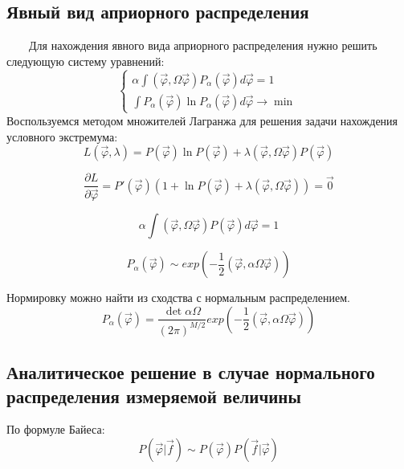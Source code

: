\documentclass{config}
\begin{document}
\subsection{Явный вид априорного распределения}
~~~~Для нахождения явного вида априорного распределения нужно решить следующую систему уравнений:
\begin{equation*}
 \begin{cases}
   \alpha \int (\vec{\varphi}, \Omega \vec{\varphi}) P_{\alpha}(\vec{\varphi}) d\vec{\varphi} = 1\\
   \int P_{\alpha}(\vec{\varphi}) \ln{P_{\alpha}(\vec{\varphi})}d \vec{\varphi} \rightarrow \min{}
 \end{cases}
\end{equation*}
Воспользуемся методом множителей Лагранжа для решения задачи нахождения условного экстремума:
\begin{equation}
    L(\vec{\varphi}, \lambda) = P(\vec{\varphi}) \ln{P(\vec{\varphi})} + \lambda (\vec{\varphi}, \Omega \vec{\varphi}) P(\vec{\varphi})
\end{equation}

\begin{equation}
    \frac{\partial L}{\partial \vec{\varphi}} = P'(\vec{\varphi}) (1 + \ln{P(\vec{\varphi})} + \lambda (\vec{\varphi}, \Omega \vec{\varphi})) = \vec{0}
\end{equation}

\begin{equation}
    \alpha \int (\vec{\varphi}, \Omega \vec{\varphi}) P(\vec{\varphi}) d\vec{\varphi} = 1
\end{equation}

\begin{equation}
    P_{\alpha}(\vec{\varphi}) \sim exp(-\frac{1}{2} (\vec{\varphi}, \alpha \Omega \vec{\varphi}))
\end{equation}

Нормировку можно найти из сходства с нормальным распределением.
\begin{equation}
    P_{\alpha}(\vec{\varphi}) = \frac{\det{\alpha \Omega}}{(2\pi)^{M/2}} exp(-\frac{1}{2} (\vec{\varphi}, \alpha \Omega \vec{\varphi}))
\end{equation}

\subsection{Аналитическое решение в случае нормального распределения измеряемой величины}
По формуле Байеса:
\begin{equation}
    P(\vec{\varphi} | \vec{f}) \sim P(\vec{\varphi}) P(\vec{f} | \vec{\varphi})
\end{equation}
\end{document}
